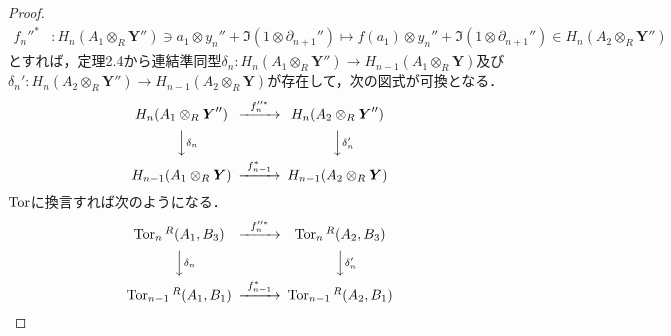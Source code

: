 \begin{proof}
\begin{align*}
    f_n''^{\ast} & \colon H_n(A_1 \otimes_R \boldsymbol{Y}'') \ni a_1 \otimes y_n'' + \Im (1 \otimes \partial_{n+1}'') \mapsto f(a_1) \otimes y_n'' + \Im (1 \otimes \partial_{n+1}'') \in H_n(A_2 \otimes_R \boldsymbol{Y}'')
  \end{align*}
  とすれば，定理2.4から連結準同型$\delta_n \colon H_n(A_1 \otimes_R \boldsymbol{Y}'') \to H_{n-1}(A_1 \otimes_R \boldsymbol{Y})$及び$\delta_n' \colon H_n(A_2 \otimes_R \boldsymbol{Y}'') \to H_{n-1}(A_2 \otimes_R \boldsymbol{Y})$が存在して，次の図式が可換となる．
  \[
  \begin{CD}
    H_n(A_1 \otimes_R \boldsymbol{Y}'') @>{f_n''^{\ast}}>> H_n(A_2 \otimes_R \boldsymbol{Y}'') \\
    @VV{\delta_n}V @VV{\delta_n'}V \\
    H_{n-1}(A_1 \otimes_R \boldsymbol{Y}) @>{f_{n-1}^{\ast}}>> H_{n-1}(A_2 \otimes_R \boldsymbol{Y})
  \end{CD}
  \]
  $\operatorname{Tor}$に換言すれば次のようになる．
  \[
  \begin{CD}
    \Tor_n{}^R (A_1, B_3) @>{f_n''^{\ast}}>> \Tor_n{}^R (A_2, B_3) \\
    @VV{\delta_n}V @VV{\delta_n'}V \\
    \Tor_{n-1}{}^R (A_1, B_1) @>{f_{n-1}^{\ast}}>> \Tor_{n-1}{}^R (A_2, B_1) \\
  \end{CD}
  \]
\end{proof}

